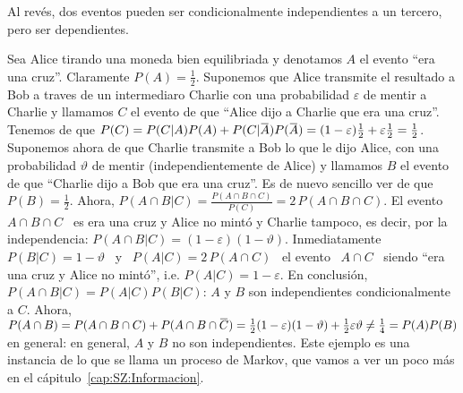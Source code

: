 Al rev\'es, dos eventos pueden ser condicionalmente independientes a un tercero,
pero  ser  dependientes.
%
\begin{ejemplo}
  Sea Alice tirando una moneda bien equilibriada y denotamos $A$ el evento ``era
  una cruz''.   Claramente $P(A) =  \frac12$.  Suponemos que Alice  transmite el
  resultado  a Bob  a traves  de un  intermediaro Charlie  con  una probabilidad
  $\varepsilon$ de mentir a Charlie y llamamos $C$ el evento de que ``Alice dijo
  a  Charlie  que  era una  cruz''.   Tenemos  de  que  $P(C)  = P(C|A)  P(A)  +
  P(C|\widebar{A})  P(\widebar{A})  =   (1-\varepsilon)  \frac12  +  \varepsilon
  \frac12 = \frac12$.  Suponemos ahora de  que Charlie transmite a Bob lo que le
  dijo Alice, con una  probabilidad $\vartheta$ de mentir (independientemente de
  Alice)  y llamamos  $B$ el  evento de  que ``Charlie  dijo a  Bob que  era una
  cruz''. Es de nuevo sencillo ver de  que $P(B) = \frac12$.  Ahora, $P(A \cap B
  |C) = \frac{P(A \cap B \cap C)}{P(C)} =  2 \, P(A \cap B \cap C)$. El evento \
  $A \cap B \cap  C$ \ es era una cruz y Alice no  mint\'o y Charlie tampoco, es
  decir, por la independencia:  $P(A \cap B |C) = (1-\varepsilon)(1-\vartheta)$.
  Inmediatamente $P(B|C) = 1-\vartheta$  \ y \ $P(A|C) = 2 \,  P(A \cap C)$ \ el
  evento \ $A \cap C$ \ siendo ``era una cruz y Alice no mint\'o'', i.e. $P(A|C)
  = 1-\varepsilon$. En  conclusi\'on, \ $P(A \cap B |C) =  P(A|C) P(B|C)$: $A$ y
  $B$ son independientes condicionalmente a $C$.  Ahora, $P(A \cap B) = P(A \cap
  B    \cap    C)   +    P(A    \cap    B    \cap   \widebar{C})    =    \frac12
  (1-\varepsilon)(1-\vartheta)  + \frac12  \varepsilon \vartheta  \ne  \frac14 =
  P(A)  P(B)$ en  general: en  general, $A$  y $B$  no son  independientes. Este
  ejemplo es una instancia de lo que  se llama un proceso de Markov, que vamos a
  ver un poco m\'as en el c\'apitulo~\ref{cap:SZ:Informacion}.
\end{ejemplo}
